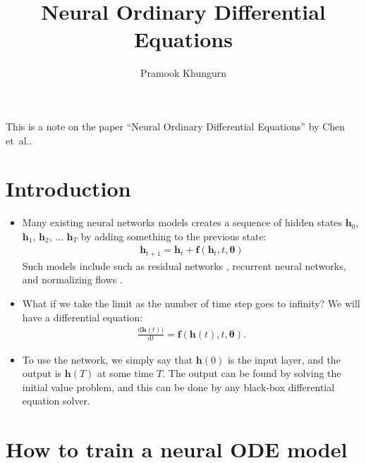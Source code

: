 \documentclass[10pt]{article}
\title{Neural Ordinary Differential Equations}
\author{Pramook Khungurn}
\newcommand{\dee}{\mathrm{d}}
\newcommand{\ve}[1]{\mathbf{#1}}
\newcommand{\ves}[1]{\boldsymbol{#1}}
\newcommand{\etal}{{et~al.}}
\begin{document}
\maketitle

This is a note on the paper ``Neural Ordinary Differential Equations'' by Chen \etal \cite{Chen:2018}.

\section{Introduction}

\begin{itemize}
  \item Many existing neural networks models creates a sequence of hidden states $\ve{h}_0$, $\ve{h}_1$, $\ve{h}_2$, $\dotsc$ $\ve{h}_T$ by adding something to the previous state:
  \begin{align*}
    \ve{h}_{t+1} = \ve{h}_t + \ve{f}(\ve{h}_t, t, \ves{\theta})
  \end{align*}
  Such models include such as residual networks \cite{He:2015}, recurrent neural networks, and normalizing flows \cite{Rezende:2015,Dinh:2014}.

  \item What if we take the limit as the number of time step goes to infinity? We will have a differential equation:
  \begin{align*}
    \frac{\dee\ve{h}(t))}{\dee t} = \ve{f}(\ve{h}(t), t, \ves{\theta}).
  \end{align*}

  \item To use the network, we simply say that $\ve{h}(0)$ is the input layer, and the output is $\ve{h}(T)$ at some time $T$. The output can be found by solving the initial value problem, and this can be done by any black-box differential equation solver. 
\end{itemize}

\section{How to train a neural ODE model}
\end{document}
